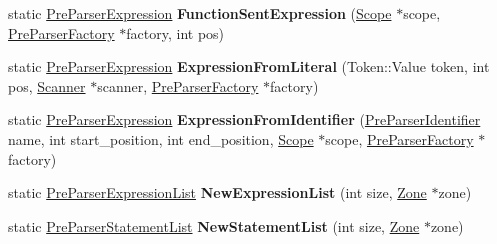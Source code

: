 \begin{DoxyCompactItemize}
\item 
static \hyperlink{classv8_1_1internal_1_1_pre_parser_expression}{Pre\+Parser\+Expression} {\bfseries Function\+Sent\+Expression} (\hyperlink{classv8_1_1internal_1_1_scope}{Scope} $\ast$scope, \hyperlink{classv8_1_1internal_1_1_pre_parser_factory}{Pre\+Parser\+Factory} $\ast$factory, int pos)\hypertarget{classv8_1_1internal_1_1_pre_parser_traits_a6f4c5420ea3078ed371ecda9a5986472}{}\label{classv8_1_1internal_1_1_pre_parser_traits_a6f4c5420ea3078ed371ecda9a5986472}

\item 
static \hyperlink{classv8_1_1internal_1_1_pre_parser_expression}{Pre\+Parser\+Expression} {\bfseries Expression\+From\+Literal} (Token\+::\+Value token, int pos, \hyperlink{classv8_1_1internal_1_1_scanner}{Scanner} $\ast$scanner, \hyperlink{classv8_1_1internal_1_1_pre_parser_factory}{Pre\+Parser\+Factory} $\ast$factory)\hypertarget{classv8_1_1internal_1_1_pre_parser_traits_a5330f8cc2a8ae1448e5cd0eb0690a3a6}{}\label{classv8_1_1internal_1_1_pre_parser_traits_a5330f8cc2a8ae1448e5cd0eb0690a3a6}

\item 
static \hyperlink{classv8_1_1internal_1_1_pre_parser_expression}{Pre\+Parser\+Expression} {\bfseries Expression\+From\+Identifier} (\hyperlink{classv8_1_1internal_1_1_pre_parser_identifier}{Pre\+Parser\+Identifier} name, int start\+\_\+position, int end\+\_\+position, \hyperlink{classv8_1_1internal_1_1_scope}{Scope} $\ast$scope, \hyperlink{classv8_1_1internal_1_1_pre_parser_factory}{Pre\+Parser\+Factory} $\ast$factory)\hypertarget{classv8_1_1internal_1_1_pre_parser_traits_a567ec249e7f1d6f50a9f41886c5d0d52}{}\label{classv8_1_1internal_1_1_pre_parser_traits_a567ec249e7f1d6f50a9f41886c5d0d52}

\item 
static \hyperlink{classv8_1_1internal_1_1_pre_parser_list}{Pre\+Parser\+Expression\+List} {\bfseries New\+Expression\+List} (int size, \hyperlink{classv8_1_1internal_1_1_zone}{Zone} $\ast$zone)\hypertarget{classv8_1_1internal_1_1_pre_parser_traits_aa0c3715cc6b4a40400bd58083549ad21}{}\label{classv8_1_1internal_1_1_pre_parser_traits_aa0c3715cc6b4a40400bd58083549ad21}

\item 
static \hyperlink{classv8_1_1internal_1_1_pre_parser_list}{Pre\+Parser\+Statement\+List} {\bfseries New\+Statement\+List} (int size, \hyperlink{classv8_1_1internal_1_1_zone}{Zone} $\ast$zone)\hypertarget{classv8_1_1internal_1_1_pre_parser_traits_a4f2832c10186fc3557fa91108ede352b}{}\label{classv8_1_1internal_1_1_pre_parser_traits_a4f2832c10186fc3557fa91108ede352b}


\end{DoxyCompactItemize}
